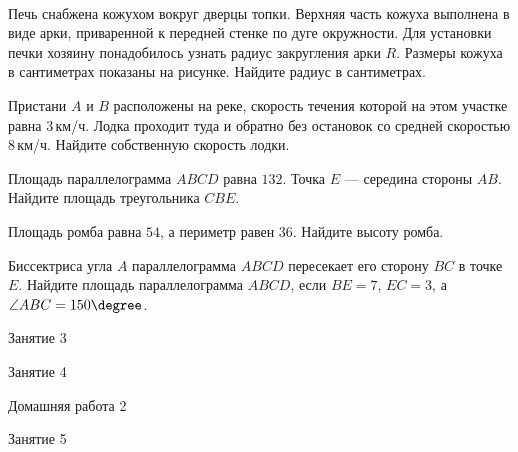 \begin{homework}[number=1]
\begin{listofex}
\begin{minipage}[c]{0.2\textwidth}
		\end{minipage}\\
		Печь снабжена кожухом вокруг дверцы топки. Верхняя часть кожуха выполнена в виде арки, приваренной к передней стенке по дуге окружности. Для установки печки хозяину понадобилось узнать радиус закругления арки \( R \). Размеры кожуха в сантиметрах показаны на рисунке. Найдите радиус в сантиметрах.
		\item Пристани \( A \) и \( B \) расположены на реке, скорость течения которой на этом участке равна \( 3 \) км/ч. Лодка проходит туда и обратно без остановок со средней скоростью \( 8 \) км/ч. Найдите собственную скорость лодки.
		\item Площадь параллелограмма \( ABCD \) равна \( 132 \). Точка \( E \) --- середина стороны \( AB \). Найдите площадь треугольника \( CBE \).
		\item Площадь ромба равна \( 54 \), а периметр равен \( 36 \). Найдите высоту ромба.
		\item Биссектриса угла \( A \) параллелограмма \( ABCD \) пересекает его сторону \( BC \) в точке \( E \). Найдите площадь параллелограмма \( ABCD \), если \( BE=7 \), \( EC=3 \), а \( \angle ABC =150\degree \).
	\end{listofex}
\end{homework}

\begin{class}[number=3]
	\begin{listofex}
		\item Занятие 3 
	\end{listofex}
\end{class}

\begin{class}[number=4]
	\begin{listofex}
		\item Занятие 4
	\end{listofex}
\end{class}

\begin{homework}[number=2]
	\begin{listofex}
		\item Домашняя работа 2
	\end{listofex}
\end{homework}

\begin{class}[number=5]
	\begin{listofex}
		\item Занятие 5
	\end{listofex}
\end{class}

